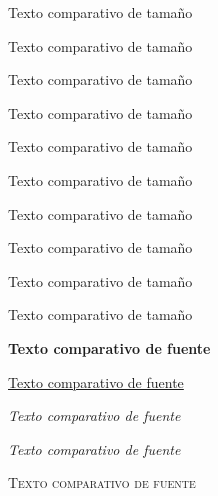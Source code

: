 \documentclass[12pt]{article}
\begin{document}
	
	\tiny{Texto comparativo de tamaño}
	
	\scriptsize{Texto comparativo de tamaño}
	
	\footnotesize{Texto comparativo de tamaño}
	
	\small{Texto comparativo de tamaño}
	
	Texto comparativo de tamaño
	
	{\large Texto comparativo de tamaño}
	
	{\Large Texto comparativo de tamaño}
	
	{\LARGE Texto comparativo de tamaño}
	
	{\huge Texto comparativo de tamaño}
	
	{\Huge Texto comparativo de tamaño}
	
		
	\textbf{Texto comparativo de fuente}
	
	\underline{Texto comparativo de fuente}
	
	\textit{Texto comparativo de fuente}
	
	\emph{Texto comparativo de fuente}
	
	\scshape{Texto comparativo de fuente}
\end{document}
